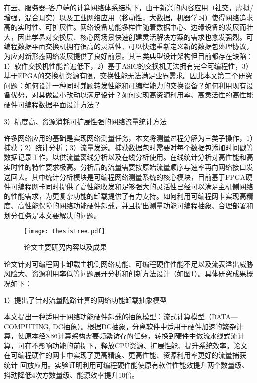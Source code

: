 在云、服务器--客户端的计算网络体系结构下，由于新兴的内容应用（社交，虚拟/增强，混合现实）以及工业网络应用（移动性，大数据，机器学习）使得网络追求高的实时性、可扩展性。网络设备功能多样性随着数据中心、边缘设备的发展而壮大，因此学界对交换层、核心网场景快速创建灵活解决方案的需求也愈发强烈。可编程数据平面交换机拥有很高的灵活性，可以快速重新定义新的数据包处理协议，为应对新形态网络发展提供了良好前景。其三类典型设计架构但目前都存在缺陷：1）软件交换机性能普遍低下，2）基于ASIC的交换机无法拥有完全可编程性，3）基于FPGA的交换机资源有限，交换性能无法满足业界需求。因此本文第二个研究问题：如何设计一种同时兼顾转发性能和可编程能力的交换设备？如何利用现有设备优势，对其做最小改动以满足设计？如何实现高资源利用率、高灵活性的高性能硬件可编程数据平面设计方法？

3）精度高、资源消耗可扩展性强的网络流量统计方法

许多网络应用的基础是实现网络测量任务，本文将测量过程分解为三类子操作，1）捕获；2）统计分析；3）流量发送。捕获数据包时需要对每个数据包添加时间戳等数据记录工作，以供流量离线分析以及在线分析使用。在线统计分析对高性能和高实时性的特性要求极高。分析后的流量需要按原始流量顺序与速率再向网络接口发送回去。其中统计分析模块是可编程网络测量系统的核心模块，目前基于FPGA硬件可编程网卡同时提供了高性能收发和足够强大的灵活性已经可以满足主机侧网络的性能需求，为更复杂功能的卸载提供了有力支持。如何利用可编程网卡实现高精度、高性能保障的网络功能硬件卸载，并且提出测量功能可编程抽象、合理部署和划分任务是本文要解决的问题。








\label{chap14}
\begin{figure}[!ht]
	\centering
	\texttt{[image: thesistree.pdf]}
	\caption{论文主要研究内容以及成果} \label{fig:thesistree}
\end{figure}

论文针对可编程网卡卸载主机侧网络功能、可编程硬件性能不足以及流表溢出威胁风险大、资源利用率低等问题展开分析和创新方法设计（如图\ref{fig:thesistree}）。具体研究成果概况如下：

1）提出了针对流量随路计算的网络功能卸载抽象模型

本文提出一种适用于网络功能硬件卸载的抽象模型：流式计算模型（DATA—COMPUTING, DC抽象）。根据DC抽象，分离软件中适用于硬件加速的繁杂计算，使原本经X86计算架构需要频繁访存的任务，转换到硬件中做流水线式流计算，可在不影响功能的前提下，释放CPU资源、扩展性能、提升系统效率。论文在可编程硬件的网卡中实现了更高精度、更高性能、资源利用率更好的流量捕获-统计-回放应用。实验证明利用可编程硬件能使原有软件性能效提升两个数量级、抖动降低4次方数量级、能源效率提升10倍。


